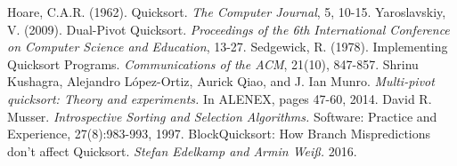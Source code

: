 \documentclass{article}
\begin{document}
\begin{thebibliography}{99}

 \label{HoareQuickSort} Hoare, C.A.R. (1962). Quicksort. \textit{The Computer Journal}, 5, 10-15.
 \label{Yaroslavskiy} Yaroslavskiy, V. (2009). Dual-Pivot Quicksort. \textit{Proceedings of the 6th International Conference on Computer Science and Education}, 13-27.
 \label{Sedgewick} Sedgewick, R. (1978). Implementing Quicksort Programs. \textit{Communications of the ACM}, 21(10), 847-857.
 \label{Kushagra} {Shrinu Kushagra, Alejandro López-Ortiz, Aurick Qiao, and J. Ian Munro. \textit{Multi-pivot quicksort: Theory and experiments.} In ALENEX, pages 47-60, 2014.}
 \label{Introsort} David R. Musser. \textit{Introspective Sorting and Selection Algorithms.} Software: Practice and Experience, 27(8):983-993, 1997.
 \label{BlockQuickSort} BlockQuicksort: How Branch Mispredictions don't affect Quicksort. \textit{Stefan Edelkamp and Armin Weiß.} 2016.
\end{thebibliography}
\end{document}
